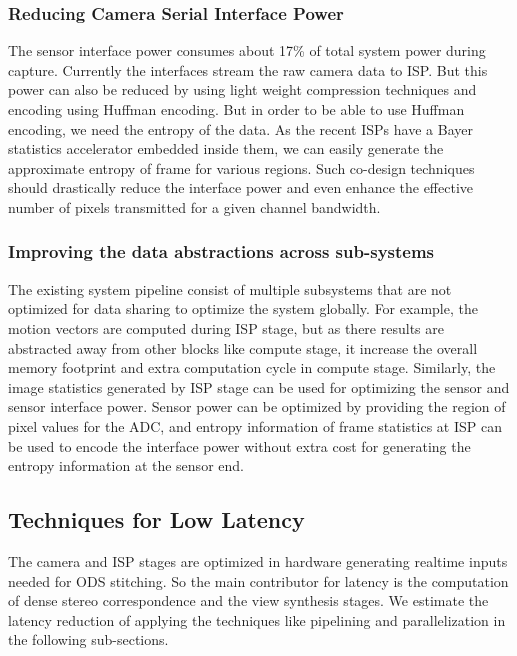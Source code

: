 \subsubsection{Reducing Camera Serial Interface Power}
The sensor interface power consumes about 17\% of total system power during capture. Currently the interfaces stream the raw camera data to ISP. But this power can also be reduced by using light weight compression techniques and encoding using Huffman encoding. But in order to be able to use Huffman encoding, we need the entropy of the data. As the recent ISPs have a Bayer statistics accelerator embedded inside them, we can easily generate the approximate entropy of frame for various regions. Such co-design techniques should drastically reduce the interface power and even enhance the effective number of pixels transmitted for a given channel bandwidth. 

\subsubsection{Improving the data abstractions across sub-systems}
The existing system pipeline consist of multiple subsystems that are not optimized for data sharing to optimize the system globally. For example, the motion vectors are computed during ISP stage, but as there results are abstracted away from  other blocks like compute stage, it increase the overall memory footprint and extra computation cycle in compute stage. Similarly, the image statistics generated by ISP stage can be used for optimizing the sensor and sensor interface power. Sensor power can be optimized by providing the region of pixel values for the ADC, and entropy information of frame statistics at ISP can be used to encode the interface power without extra cost for generating the entropy information at the sensor end. 

\subsection{Techniques for Low Latency}

The camera and ISP stages are optimized in hardware generating realtime inputs needed for ODS stitching. So the main contributor for latency is the computation of dense stereo correspondence and the view synthesis stages. We estimate the latency reduction of applying the techniques like pipelining and parallelization in the following sub-sections. \vspace{-0.3cm}

